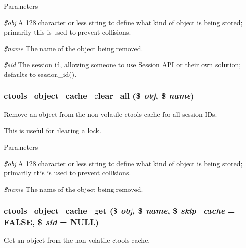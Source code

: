 \begin{DoxyParams}{Parameters}
\item[{\em \$obj}]A 128 character or less string to define what kind of object is being stored; primarily this is used to prevent collisions. \item[{\em \$name}]The name of the object being removed. \item[{\em \$sid}]The session id, allowing someone to use Session API or their own solution; defaults to session\_\-id(). \end{DoxyParams}
\hypertarget{object-cache_8inc_ab4b1d8faf6c3d55f7dea85f026cc6652}{
\subsubsection[{ctools\_\-object\_\-cache\_\-clear\_\-all}]{\setlength{\rightskip}{0pt plus 5cm}ctools\_\-object\_\-cache\_\-clear\_\-all (\$ {\em obj}, \/  \$ {\em name})}}
\label{object-cache_8inc_ab4b1d8faf6c3d55f7dea85f026cc6652}
Remove an object from the non-\/volatile ctools cache for all session IDs.

This is useful for clearing a lock.


\begin{DoxyParams}{Parameters}
\item[{\em \$obj}]A 128 character or less string to define what kind of object is being stored; primarily this is used to prevent collisions. \item[{\em \$name}]The name of the object being removed. \end{DoxyParams}
\hypertarget{object-cache_8inc_af4ea612c8ee2ee32c9a169553186dece}{
\subsubsection[{ctools\_\-object\_\-cache\_\-get}]{\setlength{\rightskip}{0pt plus 5cm}ctools\_\-object\_\-cache\_\-get (\$ {\em obj}, \/  \$ {\em name}, \/  \$ {\em skip\_\-cache} = {\ttfamily FALSE}, \/  \$ {\em sid} = {\ttfamily NULL})}}
\label{object-cache_8inc_af4ea612c8ee2ee32c9a169553186dece}
Get an object from the non-\/volatile ctools cache.

